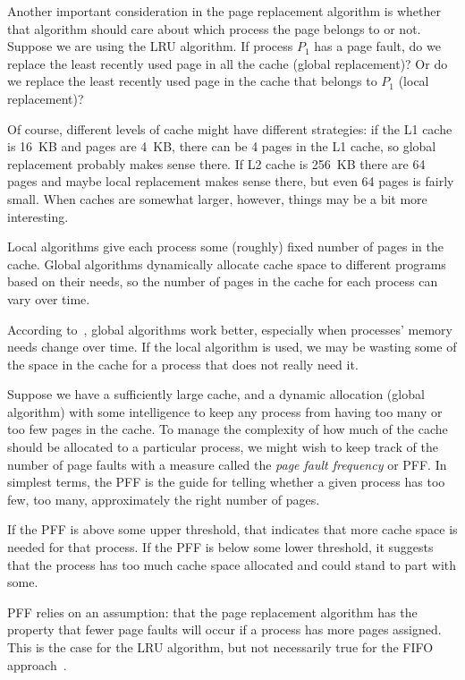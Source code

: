 Another important consideration in the page replacement algorithm is whether that algorithm should care about which process the page belongs to or not. Suppose we are using the LRU algorithm. If process $P_{1}$ has a page fault, do we replace the least recently used page in all the cache (global replacement)? Or do we replace the least recently used page in the cache that belongs to $P_{1}$ (local replacement)?

Of course, different levels of cache might have different strategies: if the L1 cache is 16~KB and pages are 4~KB, there can be 4 pages in the L1 cache, so global replacement probably makes sense there. If L2 cache is 256~KB there are 64 pages and maybe local replacement makes sense there, but even 64 pages is fairly small. When caches are somewhat larger, however, things may be a bit more interesting.

Local algorithms give each process some (roughly) fixed number of pages in the cache. Global algorithms dynamically allocate cache space to different programs based on their needs, so the number of pages in the cache for each process can vary over time. 

According to~\cite{mos}, global algorithms work better, especially when processes' memory needs change over time. If the local algorithm is used, we may be wasting some of the space in the cache for a process that does not really need it. 

Suppose we have a sufficiently large cache, and a dynamic allocation (global algorithm) with some intelligence to keep any process from having too many or too few pages in the cache. To manage the complexity of how much of the cache should be allocated to a particular process, we might wish to keep track of the number of page faults with a measure called the \textit{page fault frequency} or PFF. In simplest terms, the PFF is the guide for telling whether a given process has too few, too many, approximately the right number of pages. 

If the PFF is above some upper threshold, that indicates that more cache space is needed for that process. If the PFF is below some lower threshold, it suggests that the process has too much cache space allocated and could stand to part with some.

PFF relies on an assumption: that the page replacement algorithm has the property that fewer page faults will occur if a process has more pages assigned. This is the case for the LRU algorithm, but not necessarily true for the FIFO approach~\cite{mte241}.






